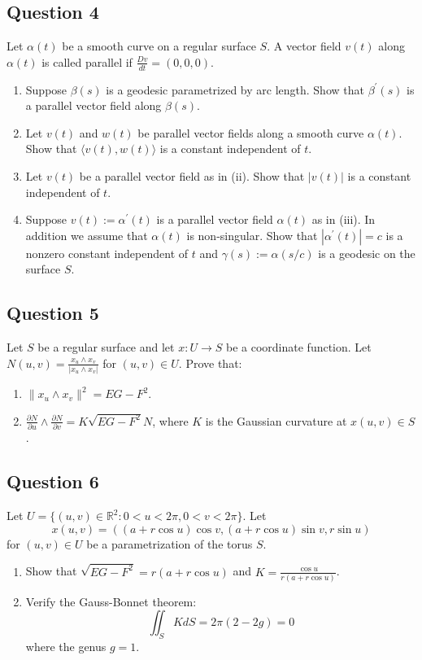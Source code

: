 \documentclass[12pt, a4paper]{article}
\newcommand{\R}{\mathbb{R}}
\newcommand{\inner}[1]{\langle #1 \rangle}
\begin{document}
\subsection*{Question 4}
Let $\alpha(t)$ be a smooth curve on a regular surface $S$. A vector field $v(t)$ along $\alpha(t)$ is called parallel if $\frac{Dv}{dt}=(0,0,0)$.
\begin{enumerate}[label=(\roman*)]
    \item Suppose $\beta(s)$ is a geodesic parametrized by arc length. Show that $\beta^{\prime}(s)$ is a parallel vector field along $\beta(s)$.
    \item Let $v(t)$ and $w(t)$ be parallel vector fields along a smooth curve $\alpha(t)$. Show that $\inner{v(t),w(t)}$ is a constant independent of $t$.
    \item Let $v(t)$ be a parallel vector field as in (ii). Show that $|v(t)|$ is a constant independent of $t$.
    \item Suppose $v(t):=\alpha^{\prime}(t)$ is a parallel vector field $\alpha(t)$ as in (iii). In addition we assume that $\alpha(t)$ is non-singular. Show that $|\alpha^{\prime}(t)|=c$ is a nonzero constant independent of $t$ and $\gamma(s):=\alpha(s/c)$ is a geodesic on the surface $S$.
\end{enumerate}
\newpage

\subsection*{Question 5}
Let $S$ be a regular surface and let $x:U\rightarrow S$ be a coordinate function. Let $N(u,v)=\frac{x_{u}\wedge x_{v}}{|x_{u}\wedge x_{v}|}$ for $(u,v)\in U$. Prove that:
\begin{enumerate}[label=(\roman*)]
    \item $\|x_{u}\wedge x_{v}\|^{2}=EG-F^{2}$.
    \item $\frac{\partial N}{\partial u}\wedge\frac{\partial N}{\partial v}=K\sqrt{EG-F^{2}}N$, where $K$ is the Gaussian curvature at $x(u,v)\in S$.
\end{enumerate}
\newpage

\subsection*{Question 6}
Let $U=\{(u,v)\in\R^{2}:0<u<2\pi,0<v<2\pi\}$. Let
\[ x(u,v)=((a+r\cos u)\cos v,(a+r\cos u)\sin v,r\sin u) \]
for $(u,v)\in U$ be a parametrization of the torus $S$.
\begin{enumerate}[label=(\roman*)]
    \item Show that $\sqrt{EG-F^{2}}=r(a+r\cos u)$ and $K=\frac{\cos u}{r(a+r\cos u)}$.
    \item Verify the Gauss-Bonnet theorem:
    \[ \iint_{S}KdS=2\pi(2-2g)=0 \]
    where the genus $g=1$.
\end{enumerate}
\newpage
\end{document}
